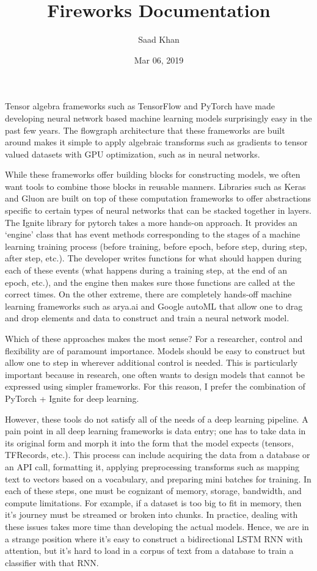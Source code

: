 \documentclass[letterpaper,10pt,english]{sphinxmanual}
\title{Fireworks Documentation}
\date{Mar 06, 2019}
\author{Saad Khan}
\begin{document}
\pagestyle{empty}
\sphinxmaketitle
\pagestyle{plain}
\sphinxtableofcontents
\pagestyle{normal}
\label{\detokenize{index::doc}}



Tensor algebra frameworks such as TensorFlow and PyTorch have made developing neural network based machine learning models surprisingly easy in the past few years. The flowgraph architecture that these frameworks are built around makes it simple to apply algebraic transforms such as gradients to tensor valued datasets with GPU optimization, such as in neural networks.

While these frameworks offer building blocks for constructing models, we often want tools to combine those blocks in reusable manners. Libraries such as Keras and Gluon are built on top of these computation frameworks to offer abstractions specific to certain types of neural networks that can be stacked together in layers. The Ignite library for pytorch takes a more hands-on approach. It provides an ‘engine’ class that has event methods corresponding to the stages of a machine learning training process (before training, before epoch, before step, during step, after step, etc.). The developer writes functions for what should happen during each of these events (what happens during a training step, at the end of an epoch, etc.), and the engine then makes sure those functions are called at the correct times. On the other extreme, there are completely hands-off machine learning frameworks such as arya.ai and Google autoML that allow one to drag and drop elements and data to construct and train a neural network model.

Which of these approaches makes the most sense? For a researcher, control and flexibility are of paramount importance. Models should be easy to construct but allow one to step in wherever additional control is needed. This is particularly important because in research, one often wants to design models that cannot be expressed using simpler frameworks. For this reason, I prefer the combination of PyTorch + Ignite for deep learning.

However, these tools do not satisfy all of the needs of a deep learning pipeline. A pain point in all deep learning frameworks is data entry; one has to take data in its original form and morph it into the form that the model expects (tensors, TFRecords, etc.). This process can include acquiring the data from a database or an API call, formatting it, applying preprocessing transforms such as mapping text to vectors based on a vocabulary, and preparing mini batches for training. In each of these steps, one must be cognizant of memory, storage, bandwidth, and compute limitations. For example, if a dataset is too big to fit in memory, then it’s journey must be streamed or broken into chunks. In practice, dealing with these issues takes more time than developing the actual models. Hence, we are in a strange position where it’s easy to construct a bidirectional LSTM RNN with attention, but it’s hard to load in a corpus of text from a database to train a classifier with that RNN.
\end{document}
